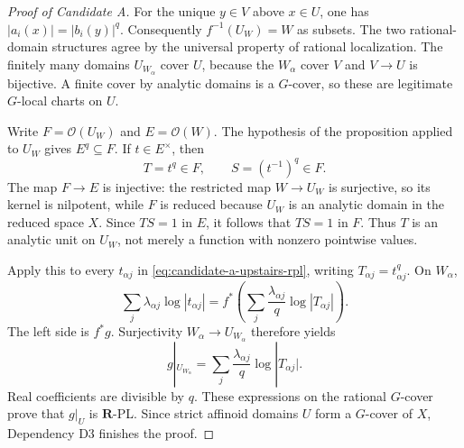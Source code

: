 \begin{proof}[Proof of Candidate A]
For the unique \(y\in V\) above \(x\in U\), one has
\(|a_i(x)|=|b_i(y)|^q\).  Consequently
\(f^{-1}(U_W)=W\) as subsets.  The two rational-domain structures agree by
the universal property of rational localization.  The finitely many
domains \(U_{W_\alpha}\) cover \(U\), because the \(W_\alpha\) cover \(V\)
and \(V\to U\) is bijective.  A finite cover by analytic domains is a
\(G\)-cover, so these are legitimate \(G\)-local charts on \(U\).

Write \(F=\mathcal O(U_W)\) and \(E=\mathcal O(W)\).  The hypothesis of the
proposition applied to \(U_W\) gives \(E^q\subseteq F\).  If
\(t\in E^\times\), then
\[
                         T=t^q\in F,
              \qquad S=(t^{-1})^q\in F.
\]
The map \(F\to E\) is injective: the restricted map
\(W\to U_W\) is surjective, so its kernel is nilpotent, while \(F\) is
reduced because \(U_W\) is an analytic domain in the reduced space \(X\).
Since \(TS=1\) in \(E\), it follows that \(TS=1\) in \(F\).  Thus \(T\) is
an analytic unit on \(U_W\), not merely a function with nonzero pointwise
values.

Apply this to every \(t_{\alpha j}\) in
\eqref{eq:candidate-a-upstairs-rpl}, writing
\(T_{\alpha j}=t_{\alpha j}^q\).  On \(W_\alpha\),
\[
 \sum_j\lambda_{\alpha j}\log|t_{\alpha j}|
 =f^*\!\left(
       \sum_j\frac{\lambda_{\alpha j}}q\log|T_{\alpha j}|
            \right).
\]
The left side is \(f^*g\).  Surjectivity
\(W_\alpha\to U_{W_\alpha}\) therefore yields
\[
       g|_{U_{W_\alpha}}
       =\sum_j\frac{\lambda_{\alpha j}}q
                         \log|T_{\alpha j}|.
\]
Real coefficients are divisible by \(q\).  These expressions on the
rational \(G\)-cover prove that \(g|_U\) is \(\mathbf R\)-PL.  Since strict
affinoid domains \(U\) form a \(G\)-cover of \(X\), Dependency D3 finishes
the proof.
\end{proof}

